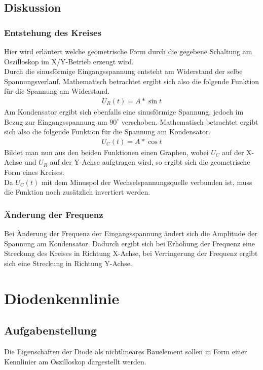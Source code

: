 \documentclass[12pt,a4paper,titlepage]{article}
\begin{document}
\subsection{Diskussion}
\subsubsection{Entstehung des Kreises}
Hier wird erl\"autert welche geometrische Form durch die gegebene Schaltung am Oszilloskop im X/Y-Betrieb erzeugt wird.\\
Durch die sinusf\"ormige Eingangsspannung entsteht am Widerstand der selbe Spannungsverlauf. Mathematisch betrachtet ergibt sich also die folgende Funktion f\"ur die Spannung am Widerstand.
\begin{align*}
  U_R(t) = A*\sin{t}
\end{align*}
Am Kondensator ergibt sich ebenfalls eine sinusf\"ormige Spannung, jedoch im Bezug zur Eingangsspannung um $90^{\circ}$ verschoben. Mathematisch betrachtet ergibt sich also die folgende Funktion f\"ur die Spannung am Kondensator.
\begin{align*}
  U_C(t) = A*\cos{t}
\end{align*}
Bildet man nun aus den beiden Funktionen einen Graphen, wobei $U_C$ auf der X-Achse und $U_R$ auf der Y-Achse aufgtragen wird, so ergibt sich die geometrische Form eines Kreises.\\
Da $U_C(t)$ mit dem Minuspol der Wechselspannungsquelle verbunden ist, muss die Funktion noch zus\"atzlich invertiert werden.

\subsubsection{\"Anderung der Frequenz}
Bei \"Anderung der Frequenz der Eingangsspannung \"andert sich die Amplitude der Spannung am Kondensator. Dadurch ergibt sich bei Erh\"ohung der Frequenz eine Streckung des Kreises in Richtung X-Achse, bei Verringerung der Frequenz ergibt sich eine Streckung in Richtung Y-Achse.



\newpage
\section{Diodenkennlinie}

\subsection{Aufgabenstellung}
Die Eigenschaften der Diode als nichtlineares Bauelement sollen in Form einer Kennlinier am Oszilloskop dargestellt werden.
\end{document}
